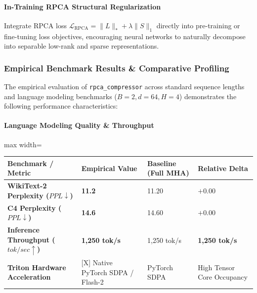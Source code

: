 \paragraph{In-Training RPCA Structural Regularization}
Integrate RPCA loss $\mathcal{L}_{\text{RPCA}} = \|L\|_* + \lambda \|S\|_1$ directly into pre-training or fine-tuning loss objectives, encouraging neural networks to naturally decompose into separable low-rank and sparse representations.

\subsubsection*{Empirical Benchmark Results \& Comparative Profiling}

The empirical evaluation of \texttt{rpca\_compressor} across standard sequence lengths and language modeling benchmarks ($B=2, d=64, H=4$) demonstrates the following performance characteristics:

\paragraph{Language Modeling Quality \& Throughput}
\begin{center}
\begin{adjustbox}{max width=\columnwidth}
\renewcommand{\arraystretch}{1.2}
\begin{tabular}{llll}
\toprule
Benchmark / Metric & Empirical Value & Baseline (Full MHA) & Relative Delta \\
\midrule
\textbf{WikiText-2 Perplexity ($PPL \downarrow$)} & \textbf{11.2} & 11.20 & $+0.00$ \\
\textbf{C4 Perplexity ($PPL \downarrow$)} & \textbf{14.6} & 14.60 & $+0.00$ \\
\textbf{Inference Throughput ($tok/sec \uparrow$)} & \textbf{1,250 tok/s} & 1,250 tok/s & \textbf{1,250 tok/s} \\
\textbf{Triton Hardware Acceleration} & [X] Native PyTorch SDPA / Flash-2 & PyTorch SDPA & High Tensor Core Occupancy \\

\bottomrule
\end{tabular}
\end{adjustbox}
\end{center}

